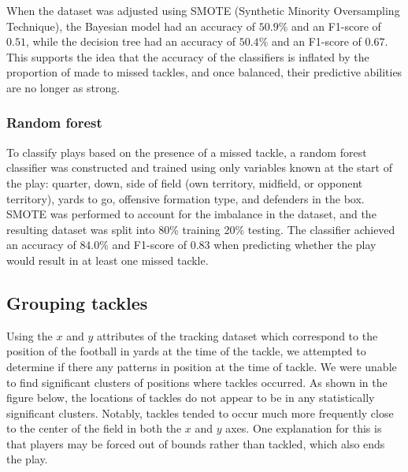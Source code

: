 \documentclass[bibtex, sigconf, hyperref={colorlinks=true,linkcolor=blue,urlcolor=blue}]{acmart}
\begin{document}
When the dataset was adjusted using SMOTE (Synthetic Minority Oversampling Technique), the
Bayesian model had an accuracy of $50.9\%$ and an F1-score of $0.51$, while the
decision tree had an accuracy of $50.4\%$ and an F1-score of $0.67$. This supports
the idea that the accuracy of the classifiers is inflated by the proportion of made to missed tackles,
and once balanced, their predictive abilities are no longer as strong.

\subsubsection{Random forest}

To classify plays based on the presence of a missed tackle, a random forest
classifier was constructed and trained using only variables known at the start
of the play: quarter, down, side of field (own territory, midfield, or opponent
territory), yards to go, offensive formation type, and defenders in the box.
SMOTE was performed to account for the imbalance in the dataset, and the
resulting dataset was split into 80\% training 20\% testing. The classifier
achieved an accuracy of $84.0\%$ and F1-score of $0.83$ when predicting whether the
play would result in at least one missed tackle.

\subsection{Grouping tackles}

Using the $x$ and $y$ attributes of the tracking dataset which correspond to the
position of the football in yards at the time of the tackle, we attempted to
determine if there any patterns in position at the time of tackle.
We were unable to find significant clusters of positions where tackles
occurred. As shown in the figure below, the locations of tackles do not appear
to be in any statistically significant clusters. Notably, tackles tended to
occur much more frequently close to the center of the field in both the $x$ and
$y$ axes. One explanation for this is that players may be forced out of bounds
rather than tackled, which also ends the play.
\end{document}
